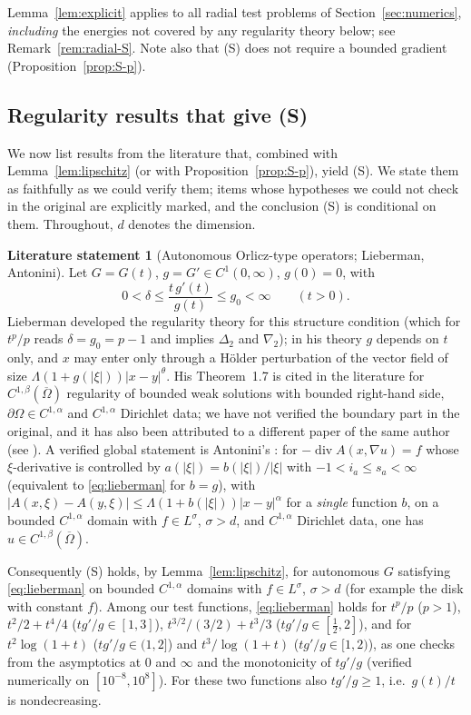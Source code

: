 \documentclass[11pt]{amsart}
\theoremstyle{definition}
\newtheorem{fact}[theorem]{Literature statement}
\theoremstyle{remark}
\numberwithin{equation}{section}
\newcommand{\abs}[1]{\lvert #1\rvert}
\DeclareMathOperator{\divg}{div}
\begin{document}
Lemma~\ref{lem:explicit} applies to all radial test problems of Section~\ref{sec:numerics}, \emph{including} the energies not covered by any regularity theory below; see Remark~\ref{rem:radial-S}. Note also that (S) does not require a bounded gradient (Proposition~\ref{prop:S-p}).

\subsection{Regularity results that give (S)}\label{ssec:regularity}
We now list results from the literature that, combined with Lemma~\ref{lem:lipschitz} (or with Proposition~\ref{prop:S-p}), yield (S). We state them as faithfully as we could verify them; items whose hypotheses we could not check in the original are explicitly marked, and the conclusion (S) is conditional on them. Throughout, $d$ denotes the dimension.

\begin{fact}[Autonomous Orlicz-type operators; Lieberman, Antonini]\label{fact:lieberman}
Let $G=G(t)$, $g=G'\in C^1(0,\infty)$, $g(0)=0$, with
\begin{equation}\label{eq:lieberman}
0<\delta\le\frac{t\,g'(t)}{g(t)}\le g_0<\infty\qquad(t>0).
\end{equation}
Lieberman \cite{Lieberman1991} developed the regularity theory for this structure condition (which for $t^p/p$ reads $\delta=g_0=p-1$ and implies $\Delta_2$ and $\nabla_2$); in his theory $g$ depends on $t$ only, and $x$ may enter only through a H\"older perturbation of the vector field of size $\Lambda(1+g(\abs\xi))\abs{x-y}^\theta$. His Theorem~1.7 is cited in the literature for $C^{1,\beta}(\overline\Omega)$ regularity of bounded weak solutions with bounded right-hand side, $\partial\Omega\in C^{1,\alpha}$ and $C^{1,\alpha}$ Dirichlet data; we have not verified the boundary part in the original, and it has also been attributed to a different paper of the same author (see \cite{Antonini2026}). A verified global statement is Antonini's \cite[Cor.~1.4]{Antonini2026}: for $-\divg A(x,\nabla u)=f$ whose $\xi$-derivative is controlled by $a(\abs\xi)=b(\abs\xi)/\abs\xi$ with $-1<i_a\le s_a<\infty$ (equivalent to \eqref{eq:lieberman} for $b=g$), with $\abs{A(x,\xi)-A(y,\xi)}\le\Lambda(1+b(\abs\xi))\abs{x-y}^\alpha$ for a \emph{single} function $b$, on a bounded $C^{1,\alpha}$ domain with $f\in L^\sigma$, $\sigma>d$, and $C^{1,\alpha}$ Dirichlet data, one has $u\in C^{1,\beta}(\overline\Omega)$.
\end{fact}
Consequently (S) holds, by Lemma~\ref{lem:lipschitz}, for autonomous $G$ satisfying \eqref{eq:lieberman} on bounded $C^{1,\alpha}$ domains with $f\in L^\sigma$, $\sigma>d$ (for example the disk with constant $f$). Among our test functions, \eqref{eq:lieberman} holds for $t^p/p$ ($p>1$), $t^2/2+t^4/4$ ($tg'/g\in[1,3]$), $t^{3/2}/(3/2)+t^3/3$ ($tg'/g\in[\tfrac12,2]$), and for $t^2\log(1+t)$ ($tg'/g\in(1,2]$) and $t^3/\log(1+t)$ ($tg'/g\in[1,2)$), as one checks from the asymptotics at $0$ and $\infty$ and the monotonicity of $tg'/g$ (verified numerically on $[10^{-8},10^8]$). For these two functions also $tg'/g\ge1$, i.e.\ $g(t)/t$ is nondecreasing.
\end{document}
